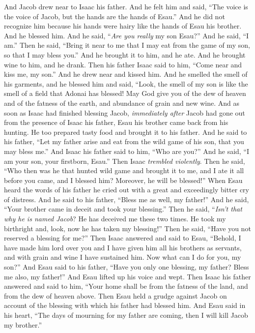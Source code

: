 \begin{biblechapter}
\verse And Jacob drew near to Isaac his father. And he felt him and said, “The voice is the voice of Jacob, but the hands are the hands of Esau.”
\verse And he did not recognize him because his hands were hairy like the hands of Esau his brother. And he blessed him.
\verse And he said, “\textit{Are you really} my son Esau?” And he said, “I am.”
\verse Then he said, “Bring it near to me that I may eat from the game of my son, so that I may bless you.” And he brought it to him, and he ate. And he brought wine to him, and he drank.
\verse Then his father Isaac said to him, “Come near and kiss me, my son.”
\verse And he drew near and kissed him. And he smelled the smell of his garments, and he blessed him and said,
\verse “Look, the smell of my son is like the smell of a field that Adonai has blessed!
\verse May God give you of the dew of heaven 
and of the fatness of the earth, 
and abundance of grain and new wine.
\verse And as soon as Isaac had finished blessing Jacob, \textit{immediately after} Jacob had gone out from the presence of Isaac his father, Esau his brother came back from his hunting.
\verse He too prepared tasty food and brought it to his father. And he said to his father, “Let my father arise and eat from the wild game of his son, that you may bless me.”
\verse And Isaac his father said to him, “Who are you?” And he said, “I am your son, your firstborn, Esau.”
\verse Then Isaac \textit{trembled violently}. Then he said, “Who then was he that hunted wild game and brought it to me, and I ate it all before you came, and I blessed him? Moreover, he will be blessed!”
\verse When Esau heard the words of his father he cried out with a great and exceedingly bitter cry of distress. And he said to his father, “Bless me as well, my father!”
\verse And he said, “Your brother came in deceit and took your blessing.”
\verse Then he said, “\textit{Isn’t that why he is named Jacob}? He has deceived me these two times. He took my birthright and, look, now he has taken my blessing!” Then he said, “Have you not reserved a blessing for me?”
\verse Then Isaac answered and said to Esau, “Behold, I have made him lord over you and I have given him all his brothers as servants, and with grain and wine I have sustained him. Now what can I do for you, my son?”
\verse And Esau said to his father, “Have you only one blessing, my father? Bless me also, my father!” And Esau lifted up his voice and wept.
\verse Then Isaac his father answered and said to him,
\verse “Your home shall be from the fatness of the land, 
and from the dew of heaven above.
\verse Then Esau held a grudge against Jacob on account of the blessing with which his father had blessed him. And Esau said in his heart, “The days of mourning for my father are coming, then I will kill Jacob my brother.”

\end{biblechapter}
